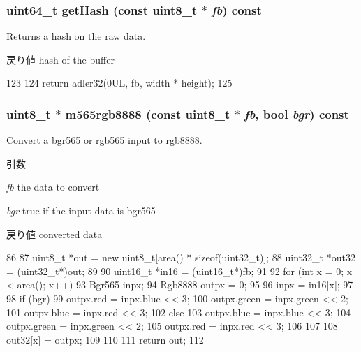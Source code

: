\label{classVideoConvert_a4773afbbd60896bb01da63f019215893}
\hypertarget{classVideoConvert_a26a77d167a3bfe87e9159a8e2a1f96cb}{
\subsubsection[{getHash}]{\setlength{\rightskip}{0pt plus 5cm}uint64\_\-t getHash (const uint8\_\-t $\ast$ {\em fb}) const}}
\label{classVideoConvert_a26a77d167a3bfe87e9159a8e2a1f96cb}
Returns a hash on the raw data.

\begin{DoxyReturn}{戻り値}
hash of the buffer 
\end{DoxyReturn}



\begin{DoxyCode}
123                                                      {
124         return adler32(0UL, fb, width * height);
125     }
\end{DoxyCode}
\hypertarget{classVideoConvert_adfe496e35ca2a33e332b0a1874ef21fa}{
\subsubsection[{m565rgb8888}]{\setlength{\rightskip}{0pt plus 5cm}uint8\_\-t $\ast$ m565rgb8888 (const uint8\_\-t $\ast$ {\em fb}, \/  bool {\em bgr}) const}}
\label{classVideoConvert_adfe496e35ca2a33e332b0a1874ef21fa}
Convert a bgr565 or rgb565 input to rgb8888. 
\begin{DoxyParams}{引数}
\item[{\em fb}]the data to convert \item[{\em bgr}]true if the input data is bgr565 \end{DoxyParams}
\begin{DoxyReturn}{戻り値}
converted data 
\end{DoxyReturn}



\begin{DoxyCode}
86 {
87     uint8_t *out = new uint8_t[area() * sizeof(uint32_t)];
88     uint32_t *out32 = (uint32_t*)out;
89 
90     uint16_t *in16 = (uint16_t*)fb;
91 
92     for (int x = 0; x < area(); x++) {
93         Bgr565 inpx;
94         Rgb8888 outpx = 0;
95 
96         inpx = in16[x];
97 
98         if (bgr) {
99             outpx.red = inpx.blue << 3;
100             outpx.green = inpx.green << 2;
101             outpx.blue = inpx.red << 3;
102         } else {
103             outpx.blue = inpx.blue << 3;
104             outpx.green = inpx.green << 2;
105             outpx.red = inpx.red << 3;
106         }
107 
108         out32[x] = outpx;
109     }
110 
111     return out;
112 }
\end{DoxyCode}


